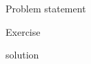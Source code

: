 \documentclass{article}
\begin{document}
 Problem statement
\setcounter{section}{1}
\setcounter{exercise}{1}
\setcounter{subexercise}{1}
\begin{subexercise}
Exercise
\end{subexercise}

\begin{solution}
solution
\end{solution}
\pagebreak
\end{document}
